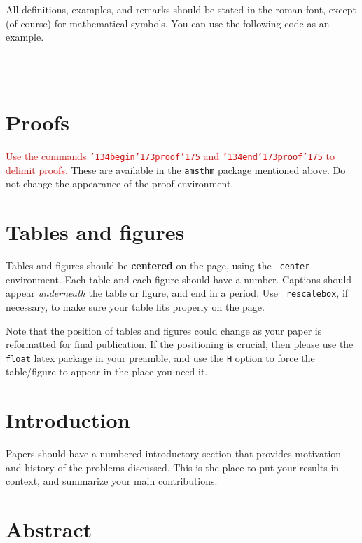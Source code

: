 \documentclass[12pt]{article}
\begin{document}
All definitions, examples, and remarks should be stated in the roman font,
except (of course) for 
mathematical symbols.  You can use the following code as an example.

 \\
 \\

\section{Proofs}

\textcolor{red}{Use the commands {\tt \char'134begin\char'173proof\char'175} and
{\tt \char'134end\char'173proof\char'175} to delimit proofs.}
These are available in the {\tt amsthm} package mentioned above.
Do not change the appearance of the proof environment.

\section{Tables and figures}

Tables and figures should be {\bf centered} on the page, using the {\tt
center} environment.  Each table and each figure should have a number.
Captions should appear {\it underneath} the table or figure, and
end in a period.  Use {\tt
rescalebox}, if necessary, to make sure your table fits properly on the
page.

Note that the position of tables and figures could change as your paper
is reformatted for final publication.  If the positioning is crucial, then
please use the {\tt float} latex package in your preamble, and use the
{\tt H} option to force the table/figure to appear in the place you
need it.    

\section{Introduction}

Papers should have a numbered introductory section that provides motivation and
history of the problems discussed.  This is the place to put your results
in context, and summarize your main contributions.

\section{Abstract}
\end{document}
